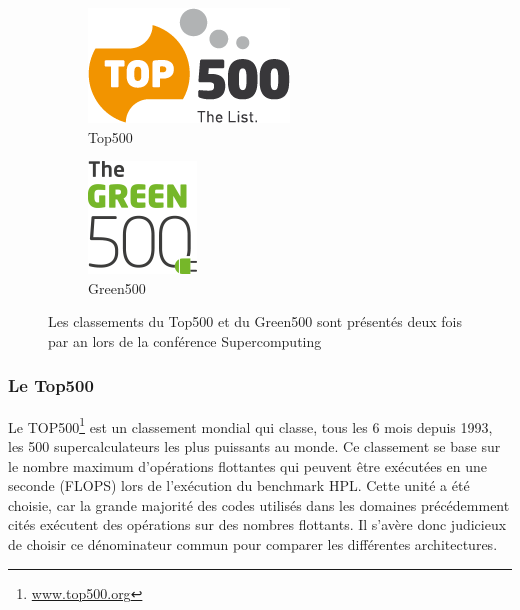         \begin{figure}[b!]
                \centering
                \begin{subfigure}[t]{0.48\textwidth}
                    \centering
                    \includegraphics[width=.4\linewidth]{images/Top500_logo.png}
                    \caption{\label{fig:Top500_logo}Top500}
                \end{subfigure}\hfill
            \begin{subfigure}[t]{0.48\textwidth}
                    \centering
                    \includegraphics[width=.25\linewidth]{images/Green500_logo.png}
                    \caption{\label{fig:Green500_logo}Green500}
            \end{subfigure}
            \caption{\label{fig:Top500} Les classements du Top500 et du Green500 sont présentés deux fois par an lors de la conférence Supercomputing\protect\footnotemark}
        \end{figure}
        
    \subsubsection{Le Top500}\label{sec:Top500}
        
        Le TOP500\footnote{\url{www.top500.org}} est un classement mondial qui classe, tous les 6 mois depuis 1993, les 500 supercalculateurs les plus puissants au monde. Ce classement se base sur le nombre maximum d'opérations flottantes qui peuvent être exécutées en une seconde (\gls{FLOPS}) lors de l'exécution du benchmark HPL. Cette unité a été choisie, car la grande majorité des codes utilisés dans les domaines précédemment cités exécutent des opérations sur des nombres flottants. Il s'avère donc judicieux de choisir ce dénominateur commun pour comparer les différentes architectures.


